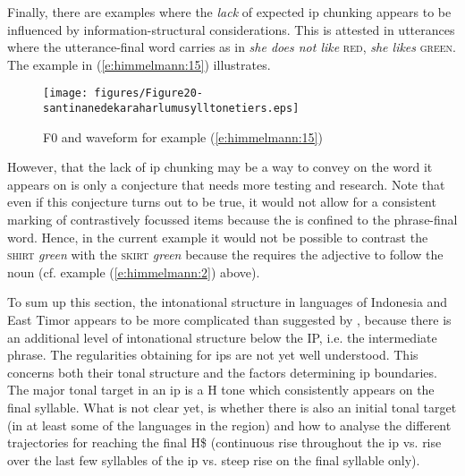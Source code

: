 \documentclass[output=paper
,modfonts
,nonflat]{langsci/langscibook}
\begin{document}
\noindent
Finally, there are examples where the \textit{lack} of expected ip chunking appears to be influenced by information-structural considerations. This is attested in utterances where the utterance-final word carries  as in \textit{she does not like} \textsc{red}, \textit{she likes} \textsc{green}. The  example in (\ref{e:himmelmann:15}) illustrates. 


\begin{figure}
	\texttt{[image: figures/Figure20-santinanedekaraharlumusylltonetiers.eps]}
	\caption{F0 and waveform for example (\ref{e:himmelmann:15})}
	\label{f20}
\end{figure}

\largerpage
However, that the lack of ip chunking may be a way to convey  on the word it appears on is only a conjecture that needs more testing and research. Note that even if this conjecture turns out to be true, it would not allow for a consistent marking of contrastively focussed items because the  is confined to the phrase-final word. Hence, in the current example it would not be possible to contrast the \textsc{shirt} \textit{green} with the \textsc{skirt} \textit{green} because the  requires the adjective to follow the noun (cf. example (\ref{e:himmelmann:2}) above).

To sum up this section, the intonational structure in  languages of Indonesia and East Timor appears to be more complicated than suggested by , because there is an additional level of intonational structure below the IP, i.e. the intermediate phrase. The regularities obtaining for ips are not yet well understood. This concerns both their tonal structure and the factors determining ip boundaries. The major tonal target in an ip is a H tone which consistently appears on the final syllable. What is not clear yet, is whether there is also an initial tonal target (in at least some of the languages in the region) and how to analyse the different trajectories for reaching the final H\$ (continuous rise throughout the ip vs. rise over the last few syllables of the ip vs. steep rise on the final syllable only). 
\end{document}
